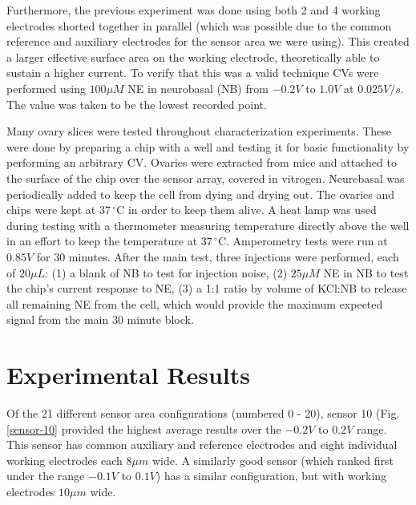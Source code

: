 \documentclass[twocolumn]{article}
\begin{document}
Furthermore, the previous experiment was done using both 2 and 4 working electrodes shorted together in parallel (which was possible due to the common reference and auxiliary electrodes for the sensor area we were using). This created a larger effective surface area on the working electrode, theoretically able to sustain a higher current. To verify that this was a valid technique CVs were performed using $100\mu M$ NE in neurobasal (NB) from $-0.2V$ to $1.0V$ at $0.025V/s$. The value was taken to be the lowest recorded point.

Many ovary slices were tested throughout characterization experiments. These were done by preparing a chip with a well and testing it for basic functionality by performing an arbitrary CV. Ovaries were extracted from mice and attached to the surface of the chip over the sensor array, covered in vitrogen. Neurebasal was periodically added to keep the cell from dying and drying out. The ovaries and chips were kept at $37\,^{\circ}\mathrm{C}$ in order to keep them alive. A heat lamp was used during testing with a thermometer measuring temperature directly above the well in an effort to keep the temperature at $37\,^{\circ}\mathrm{C}$. Amperometry tests were run at $0.85V$ for 30 minutes. After the main test, three injections were performed, each of $20\mu L$: (1) a blank of NB to test for injection noise, (2) $25\mu M$ NE in NB to test the chip's current response to NE, (3) a 1:1 ratio by volume of KCl:NB to release all remaining NE from the cell, which would provide the maximum expected signal from the main 30 minute block.

\section{Experimental Results}

Of the 21 different sensor area configurations (numbered 0 - 20), sensor 10 (Fig. \ref{sensor-10} provided the highest average results over the $-0.2V$ to $0.2V$ range. This sensor has common auxiliary and reference electrodes and eight individual working electrodes each $8\mu m$ wide. A similarly good sensor (which ranked first under the range $-0.1V$ to $0.1V$) has a similar configuration, but with working electrodes $10\mu m$ wide.
\end{document}
